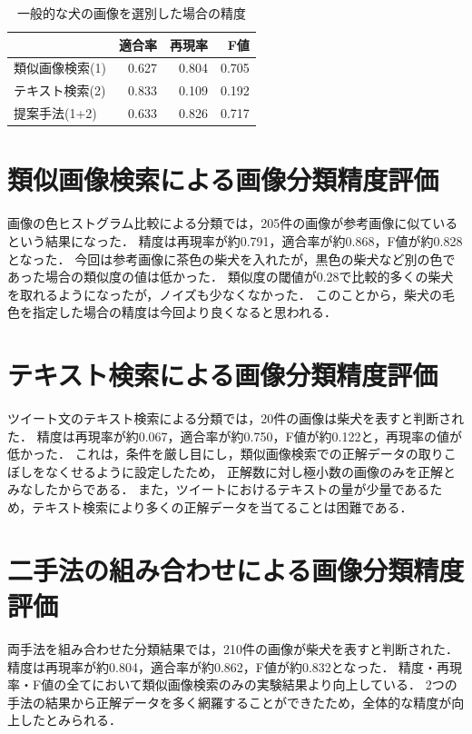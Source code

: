 \begin{table}[tb]
\begin{center}
\caption{一般的な犬の画像を選別した場合の精度}
\label{tab:result-dog}
\begin{tabular}{|l|r|r|r|}\hline
& 適合率& 再現率& F値\\ \hline \hline
類似画像検索(1)& 0.627& 0.804& 0.705 \\ \hline
テキスト検索(2)& 0.833& 0.109& 0.192 \\ \hline
提案手法(1+2)& 0.633& 0.826& 0.717 \\ \hline
\end{tabular}
\end{center}
\end{table}

\section{類似画像検索による画像分類精度評価}

画像の色ヒストグラム比較による分類では，205件の画像が参考画像に似ているという結果になった．
精度は再現率が約0.791，適合率が約0.868，F値が約0.828となった．
今回は参考画像に茶色の柴犬を入れたが，黒色の柴犬など別の色であった場合の類似度の値は低かった．
類似度の閾値が0.28で比較的多くの柴犬を取れるようになったが，ノイズも少なくなかった．
このことから，柴犬の毛色を指定した場合の精度は今回より良くなると思われる．

\section{テキスト検索による画像分類精度評価}
ツイート文のテキスト検索による分類では，20件の画像は柴犬を表すと判断された．
精度は再現率が約0.067，適合率が約0.750，F値が約0.122と，再現率の値が低かった．
これは，条件を厳し目にし，類似画像検索での正解データの取りこぼしをなくせるように設定したため，
正解数に対し極小数の画像のみを正解とみなしたからである．
また，ツイートにおけるテキストの量が少量であるため，テキスト検索により多くの正解データを当てることは困難である．

\section{二手法の組み合わせによる画像分類精度評価}
両手法を組み合わせた分類結果では，210件の画像が柴犬を表すと判断された．
精度は再現率が約0.804，適合率が約0.862，F値が約0.832となった．
精度・再現率・F値の全てにおいて類似画像検索のみの実験結果より向上している．
2つの手法の結果から正解データを多く網羅することができたため，全体的な精度が向上したとみられる．




